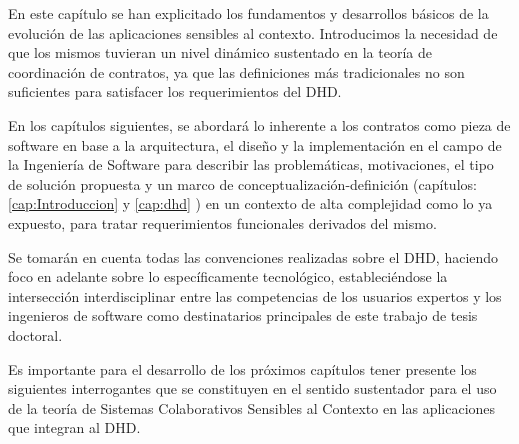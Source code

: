 En este capítulo se han explicitado los fundamentos y desarrollos básicos de la evolución
de las aplicaciones sensibles al contexto. Introducimos la necesidad de que los mismos tuvieran un nivel dinámico sustentado en la teoría de coordinación de
contratos, ya que las definiciones más tradicionales no son suficientes para satisfacer los requerimientos del DHD.

En los capítulos siguientes, se abordará lo inherente a los contratos como pieza de software en base a la arquitectura, el diseño y la implementación en el campo de la Ingeniería de Software para describir las problemáticas, motivaciones,
el tipo de solución propuesta y un marco de conceptualización-definición (capítulos: \ref{cap:Introduccion} y \ref{cap:dhd} ) en un contexto de alta complejidad como lo ya expuesto, para tratar requerimientos funcionales derivados del mismo. 

Se tomarán en cuenta todas las convenciones realizadas sobre el DHD, haciendo foco en adelante sobre lo específicamente tecnológico, estableciéndose la intersección interdisciplinar entre las competencias de los usuarios expertos y los ingenieros de software como destinatarios principales de este trabajo de tesis doctoral. 

Es importante para el desarrollo de los próximos capítulos tener presente los siguientes interrogantes que se constituyen en el sentido sustentador para el uso de la teoría de Sistemas Colaborativos Sensibles al Contexto en las aplicaciones que integran al DHD. 


